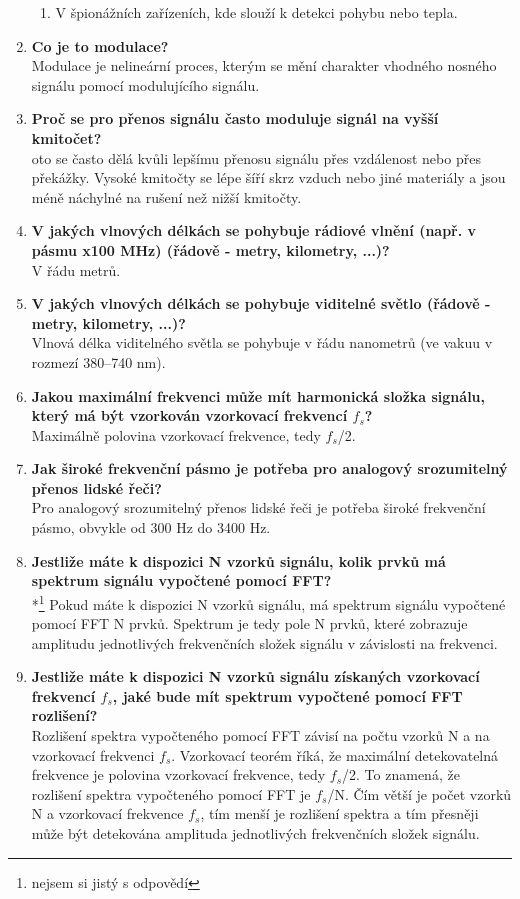 \documentclass{article}
\begin{document}
\begin{enumerate}
\begin{enumerate}
            \item {V špionážních zařízeních, kde slouží k detekci pohybu nebo tepla.}
        \end{enumerate}
        \item \textbf{Co je to modulace?} \\[0.6em] { Modulace je nelineární proces, kterým se mění charakter vhodného nosného signálu pomocí modulujícího signálu.}
        \item \textbf{Proč se pro přenos signálu často moduluje signál na vyšší kmitočet?} \\[0.6em] { oto se často dělá kvůli lepšímu přenosu signálu přes vzdálenost nebo přes překážky. Vysoké kmitočty se lépe šíří skrz vzduch nebo jiné materiály a jsou méně náchylné na rušení než nižší kmitočty.}
        \item \textbf{V jakých vlnových délkách se pohybuje rádiové vlnění (např. v pásmu x100 MHz) (řádově - metry, kilometry, ...)? } \\[0.6em] {V řádu metrů.}
        \item \textbf{V jakých vlnových délkách se pohybuje viditelné světlo (řádově - metry, kilometry, ...)? } \\[0.6em] { Vlnová délka viditelného světla se pohybuje v řádu nanometrů (ve vakuu v rozmezí 380–740 nm).}
        \item \textbf{Jakou maximální frekvenci může mít harmonická složka signálu, který má být vzorkován vzorkovací frekvencí $f_s$? } \\[0.6em] { Maximálně polovina vzorkovací frekvence, tedy $f_s$/2.}
        \item \textbf{Jak široké frekvenční pásmo je potřeba pro analogový srozumitelný přenos lidské řeči? } \\[0.6em] { Pro analogový srozumitelný přenos lidské řeči je potřeba široké frekvenční pásmo, obvykle od 300 Hz do 3400 Hz.}
        \item \textbf{Jestliže máte k dispozici N vzorků signálu, kolik prvků má spektrum signálu vypočtené pomocí FFT?} \\[0.6em] {*\footnote[5]{nejsem si jistý s odpovědí} Pokud máte k dispozici N vzorků signálu, má spektrum signálu vypočtené pomocí FFT N prvků. Spektrum je tedy pole N prvků, které zobrazuje amplitudu jednotlivých frekvenčních složek signálu v závislosti na frekvenci.}
        \item \textbf{Jestliže máte k dispozici N vzorků signálu získaných vzorkovací frekvencí $f_s$, jaké bude mít spektrum vypočtené pomocí FFT rozlišení?} \\[0.6em] { Rozlišení spektra vypočteného pomocí FFT závisí na počtu vzorků N a na vzorkovací frekvenci $f_s$. Vzorkovací teorém říká, že maximální detekovatelná frekvence je polovina vzorkovací frekvence, tedy $f_s$/2. To znamená, že rozlišení spektra vypočteného pomocí FFT je $f_s$/N. Čím větší je počet vzorků N a vzorkovací frekvence $f_s$, tím menší je rozlišení spektra a tím přesněji může být detekována amplituda jednotlivých frekvenčních složek signálu.}

\end{enumerate}
\end{document}
